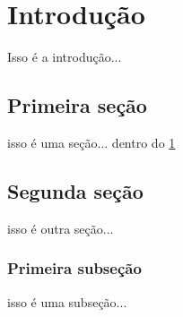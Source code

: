 

    \chapter{Introdução}
    \label{chap:intro}
    
    Isso é a introdução...
    
    \section{Primeira seção}
    \label{sec:pri}
    
    isso é uma seção... dentro do \ref{chap:intro} %
    
    \section{Segunda seção}
    \label{sec:seg}
    
    isso é outra seção...
    
    \subsection{Primeira subseção}
    \label{sec:prisub}
    
    isso é uma subseção...

